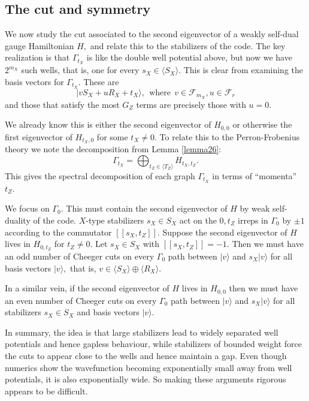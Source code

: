 \documentclass[11pt,oneside]{article}
\newcommand{\ket}[1]{|{#1}\rangle}
\def\Span#1{\langle #1 \rangle}
\def\smbox#1{\ \ \mbox{#1}\ \ }
\newcommand{\Field}{\mathcal{F}}
\def\Frd{\Field_{r}}
\begin{document}
\subsection{The cut and symmetry}\label{Sec72}

We now study 
the cut associated to the second eigenvector of a 
weakly self-dual gauge Hamiltonian $H,$
and relate this to the stabilizers of the code.
The key realization is that $\Gamma_{t_X}$ is like
the double well potential above,
but now we have $2^{m_X}$ such wells,
that is, one for every $s_X\in \Span{S_X}.$
This is clear from examining the basis vectors for $\Gamma_{t_X}.$
These are 
$$
    \ket{v S_X + u R_X + t_X}, \smbox{where} v\in \Field_{m_X}, u\in\Frd
$$
and those that satisfy the most $G_Z$ terms are
precisely those with $u=0.$

We already know this is either the second eigenvector of $H_{0,0}$
or otherwise the first eigenvector of $H_{t_X,0}$ for some $t_X \ne 0.$
To relate this to the Perron-Frobenius theory we note the 
decomposition from Lemma \ref{lemma26}:
$$
    \Gamma_{t_X} = \bigoplus_{t_Z\in\Span{T_Z}} H_{t_X, t_Z}.
$$
This gives the spectral decomposition of each graph $\Gamma_{t_X}$ 
in terms of ``momenta'' $t_Z.$

We focus on $\Gamma_0.$
This must contain the second eigenvector of $H$ by weak self-duality of the code.
$X$-type stabilizers $s_X\in S_X$ act on the $0,t_Z$ irreps in $\Gamma_0$
by $\pm 1$ according to the commutator $[[s_X, t_Z]].$
Suppose the second eigenvector of $H$ lives in
$H_{0,t_Z}$ for $t_Z\ne 0$. 
Let $s_X\in S_X$ with $[[s_X, t_Z]]=-1.$
Then we must have an odd number of Cheeger cuts 
on every $\Gamma_0$ path between $\ket{v}$ and $s_X\ket{v}$ for all basis
vectors $\ket{v},$ that is, $v\in\Span{S_X}\oplus\Span{R_X}.$

In a similar vein, if the second eigenvector of $H$ lives in $H_{0,0}$
then we must have an even number of Cheeger cuts 
on every $\Gamma_0$ path between $\ket{v}$ and $s_X\ket{v}$ for all stabilizers $s_X\in S_X$
and basis vectors $\ket{v}.$

In summary, the idea is that large stabilizers lead to
widely separated well potentials and hence gapless behaviour,
while stabilizers of bounded weight force the cuts to
appear close to the wells and hence maintain a gap.
Even though numerics show the wavefunction becoming 
exponentially small away from well potentials,
it is also exponentially wide.
So making these arguments rigorous appears to be difficult.
\end{document}
